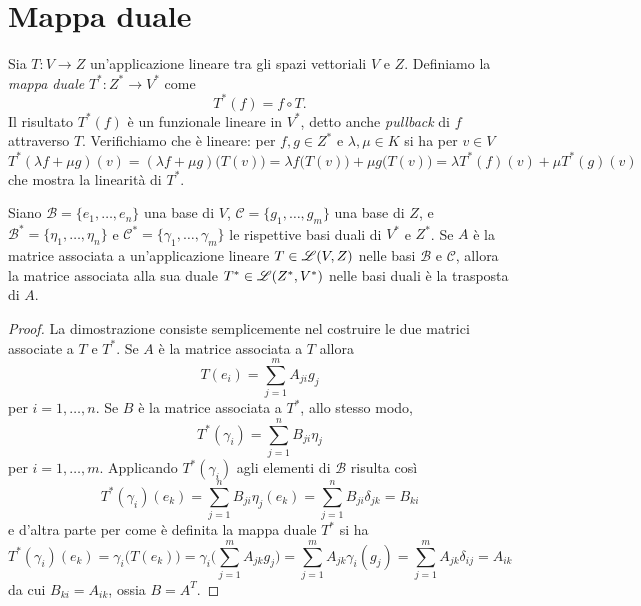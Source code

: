 \section{Mappa duale}
Sia $T\colon V\to Z$ un'applicazione lineare tra gli spazi vettoriali $V$ e $Z$.
Definiamo la \emph{mappa duale} $T^*\colon Z^*\to V^*$ come
\begin{equation}
	T^*(f)=f\circ T.
	\label{eq:mappa-duale}
\end{equation}
Il risultato $T^*(f)$ è un funzionale lineare in $V^*$, detto anche \emph{pullback} di $f$ attraverso $T$.
Verifichiamo che è lineare: per $f,g\in Z^*$ e $\lambda,\mu\in K$ si ha per $v\in V$
\begin{equation}
	T^*(\lambda f+\mu g)(v)=(\lambda f+\mu g)\big(T(v)\big)=\lambda f\big(T(v)\big)+\mu g\big(T(v)\big)=\lambda T^*(f)(v)+\mu T^*(g)(v)
\end{equation}
che mostra la linearità di $T^*$.
\begin{teorema} \label{t:matrice-associata-trasposta}
	Siano $\mathcal B=\{e_1,\dots,e_n\}$ una base di $V$, $\mathcal C=\{g_1,\dots,g_m\}$ una base di $Z$, e $\mathcal B^*=\{\eta_1,\dots,\eta_n\}$ e $\mathcal C^*=\{\gamma_1,\dots,\gamma_m\}$ le rispettive basi duali di $V^*$ e $Z^*$.
	Se $A$ è la matrice associata a un'applicazione lineare $T\in\mathscr L(V,Z)$ nelle basi $\mathcal B$ e $\mathcal C$, allora la matrice associata alla sua duale $T^*\in\mathscr L(Z^*,V^*)$ nelle basi duali è la trasposta di $A$.
\end{teorema}
\begin{proof}
	La dimostrazione consiste semplicemente nel costruire le due matrici associate a $T$ e $T^*$.
	Se $A$ è la matrice associata a $T$ allora
	\begin{equation}
		T(e_i)=\sum_{j=1}^mA_{ji}g_j
	\end{equation}
	per $i=1,\dots,n$.
	Se $B$ è la matrice associata a $T^*$, allo stesso modo,
	\begin{equation}
		T^*(\gamma_i)=\sum_{j=1}^nB_{ji}\eta_j
	\end{equation}
	per $i=1,\dots,m$.
	Applicando $T^*(\gamma_i)$ agli elementi di $\mathcal B$ risulta cos\`i
	\begin{equation}
		T^*(\gamma_i)(e_k)=\sum_{j=1}^nB_{ji}\eta_j(e_k)=\sum_{j=1}^nB_{ji}\delta_{jk}=B_{ki}
	\end{equation}
	e d'altra parte per come è definita la mappa duale $T^*$ si ha
	\begin{equation}
		T^*(\gamma_i)(e_k)=\gamma_i\big(T(e_k)\big)=\gamma_i\bigg(\sum_{j=1}^mA_{jk}g_j\bigg)=\sum_{j=1}^mA_{jk}\gamma_i(g_j)=\sum_{j=1}^mA_{jk}\delta_{ij}=A_{ik}
	\end{equation}
	da cui $B_{ki}=A_{ik}$, ossia $B=A^T$.
\end{proof}

